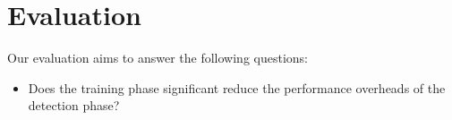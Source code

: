 \documentclass[letterpaper,twocolumn,10pt]{article}
\newcommand{\TextToolname}{Malcontent}
\newcommand{\Toolname}{\textsc{\TextToolname{}}}
\begin{document}
\section{Evaluation}\label{sec:evaluation}
Our evaluation aims to answer the following questions:
\begin{itemize}
\item Does the training phase significant reduce the performance overheads of the detection phase?

\end{itemize}

%
%
%
%
%




\end{document}

